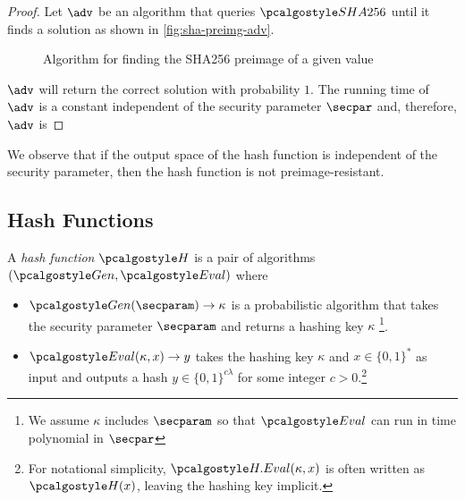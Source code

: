 \begin{proof}
  Let $\adv$ be an algorithm that queries $\algo{SHA256}$ until it finds a solution as shown in \autoref{fig:sha-preimg-adv}.
  \begin{figure}[tbhp]
  \begin{center}
    \begin{tcolorbox}[width=5cm]
      \begin{pchstack}[center]
      \end{pchstack}
    \end{tcolorbox}
  \end{center}
  \caption{Algorithm for finding the SHA256 preimage of a given value \label{fig:sha-preimg-adv}}
  \end{figure}
  $\adv$ will return the correct solution with probability $1$.
  The running time of $\adv$ is a constant independent of the security parameter $\secpar$ and, therefore, $\adv$ is \ppt
\end{proof}


We observe that if the output space of the hash function is independent of the security parameter, then the hash function is not preimage-resistant.

\subsection{Hash Functions}

\begin{definition}
  A \emph{hash function} $\algo{H}$ is a pair of \ppt algorithms $(\algo{Gen}, \algo{Eval})$ where
  \begin{itemize}
  \item $\algo{Gen}(\secparam) \rightarrow \kappa$ is a probabilistic algorithm that takes the security parameter $\secparam$ and returns a hashing key $\kappa$ \footnote{We assume $\kappa$ includes $\secparam$ so that $\algo{Eval}$ can run in time polynomial in $\secpar$}.
  \item $\algo{Eval}(\kappa, x) \rightarrow y$ takes the hashing key $\kappa$ and $x\in \{0,1\}^*$ as input and outputs a hash $y\in \{0,1\}^{c\lambda}$ for some integer $c > 0$.\footnote{For notational simplicity, $\algo{H.Eval}(\kappa, x)$ is often written as $\algo{H}(x)$, leaving the hashing key implicit.}
  \end{itemize}
\end{definition}

